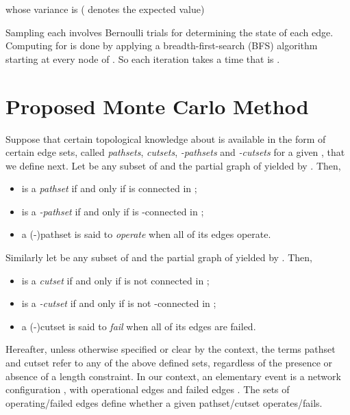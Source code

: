\documentclass[a4paper]{article}
\begin{document}
whose variance is ( denotes the expected value)



Sampling each  involves  Bernoulli trials for determining the state of each edge. Computing  for  is done by applying a breadth-first-search (BFS) algorithm starting at every node of . So each iteration takes a time that is .



\section{Proposed Monte Carlo Method} \label{s:bounded}

Suppose that certain topological knowledge about  is available in the form of certain edge sets, called \emph{pathsets}, \emph{cutsets}, \emph{-pathsets} and \emph{-cutsets} for a given , that we define next. Let  be any subset of  and  the partial graph of  yielded by . Then,

\begin{itemize}
\item  is a \emph{pathset} if and only if  is connected in ;
\item  is a \emph{\mbox{-pathset}} if and only if  is \mbox{-connected} in ;
\item a \mbox{(-)pathset} is said to \emph{operate} when all of its edges operate.
\end{itemize}

Similarly let  be any subset of  and  the partial graph of  yielded by . Then,

\begin{itemize}
\item  is a \emph{cutset} if and only if  is not connected in ;
\item  is a \emph{\mbox{-cutset}} if and only if  is not \mbox{-connected} in ;
\item a \mbox{(-)cutset} is said to \emph{fail} when all of its edges are failed.
\end{itemize}

Hereafter, unless otherwise specified or clear by the context, the terms pathset and cutset refer to any of the above defined sets, regardless of the presence or absence of a length constraint. In our context, an elementary event is a network configuration , with operational edges  and failed edges . The sets of operating/failed edges define whether a given pathset/cutset operates/fails. \\
 
\end{document}
